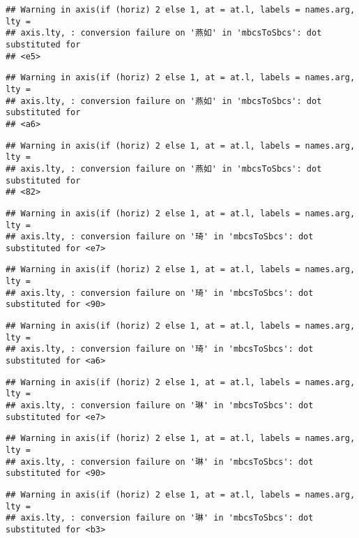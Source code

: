 \documentclass[
]{article}
\begin{document}
\begin{verbatim}
## Warning in axis(if (horiz) 2 else 1, at = at.l, labels = names.arg, lty =
## axis.lty, : conversion failure on '燕如' in 'mbcsToSbcs': dot substituted for
## <e5>
\end{verbatim}

\begin{verbatim}
## Warning in axis(if (horiz) 2 else 1, at = at.l, labels = names.arg, lty =
## axis.lty, : conversion failure on '燕如' in 'mbcsToSbcs': dot substituted for
## <a6>
\end{verbatim}

\begin{verbatim}
## Warning in axis(if (horiz) 2 else 1, at = at.l, labels = names.arg, lty =
## axis.lty, : conversion failure on '燕如' in 'mbcsToSbcs': dot substituted for
## <82>
\end{verbatim}

\begin{verbatim}
## Warning in axis(if (horiz) 2 else 1, at = at.l, labels = names.arg, lty =
## axis.lty, : conversion failure on '琦' in 'mbcsToSbcs': dot substituted for <e7>
\end{verbatim}

\begin{verbatim}
## Warning in axis(if (horiz) 2 else 1, at = at.l, labels = names.arg, lty =
## axis.lty, : conversion failure on '琦' in 'mbcsToSbcs': dot substituted for <90>
\end{verbatim}

\begin{verbatim}
## Warning in axis(if (horiz) 2 else 1, at = at.l, labels = names.arg, lty =
## axis.lty, : conversion failure on '琦' in 'mbcsToSbcs': dot substituted for <a6>
\end{verbatim}

\begin{verbatim}
## Warning in axis(if (horiz) 2 else 1, at = at.l, labels = names.arg, lty =
## axis.lty, : conversion failure on '琳' in 'mbcsToSbcs': dot substituted for <e7>
\end{verbatim}

\begin{verbatim}
## Warning in axis(if (horiz) 2 else 1, at = at.l, labels = names.arg, lty =
## axis.lty, : conversion failure on '琳' in 'mbcsToSbcs': dot substituted for <90>
\end{verbatim}

\begin{verbatim}
## Warning in axis(if (horiz) 2 else 1, at = at.l, labels = names.arg, lty =
## axis.lty, : conversion failure on '琳' in 'mbcsToSbcs': dot substituted for <b3>
\end{verbatim}
\end{document}
